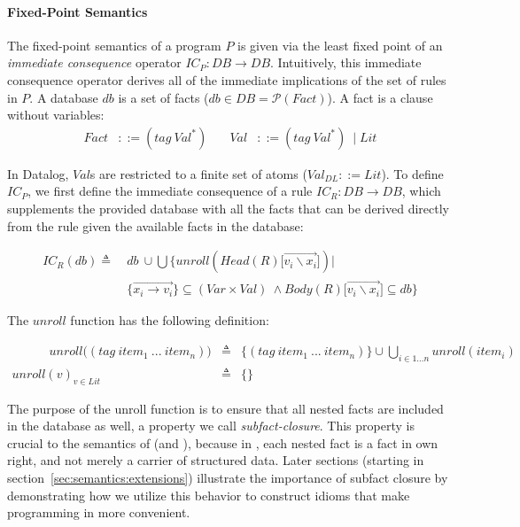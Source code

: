 \paragraph*{Fixed-Point Semantics}

The fixed-point semantics of a \core{} program $P$ is given via the
least fixed point of an \emph{immediate consequence} operator
$\textit{IC}_P : \textit{DB} \rightarrow \textit{DB}$. Intuitively,
this immediate consequence operator derives all of the immediate
implications of the set of rules in $P$. A
database $\textit{db}$ is a set of facts ($\textit{db} \in \textit{DB}
= \mathcal{P}(\textit{Fact})$). A fact is a clause without variables:
\begin{align*}
\textit{Fact} &::= (\textit{tag}\ \textit{Val}^*) & \quad
\textit{Val}  &::= (\textit{tag}\ \textit{Val}^*)\ \mid \textit{Lit}
\end{align*}

In Datalog, $\textit{Val}$s are restricted to a finite set of atoms
($\textit{Val}_{\textit{DL}} ::= \textit{Lit}$). To define $IC_P$, we
first define the immediate consequence of a rule $IC_R : DB
\rightarrow DB$, which supplements the provided database with all the
facts that can be derived directly from the rule given the available
facts in the database:

\begin{align*}    
\textit{IC}_R(db) \triangleq\ & db\ \cup \bigcup \bigl\{ \textit{unroll}(\textit{Head}(R)\big[\overrightarrow{v_i\backslash x_i}\big]) | \\
& \{\overrightarrow{x_i \rightarrow v_i}\} \subseteq (\textit{Var} \times \textit{Val})\ \wedge
\textit{Body}(R)\big[\overrightarrow{v_i \backslash x_i}\big] \subseteq db \bigr\}
\end{align*}

The $unroll$ function has the following definition:

\begin{centering}
  {\centering$\begin{array}{rcl}
\quad\quad\quad \textit{unroll}\bigl((\textit{tag}\ \textit{item}_1\ ...\ \textit{item}_n)\bigr) &\triangleq&
\{(\textit{tag}\ \textit{item}_1\ ...\ \textit{item}_n)\} \cup \bigcup_{i \in {1 ... n}} \textit{unroll}(\textit{item}_i)   \\
\textit{unroll}(v)_{v \in \textit{Lit}} &\triangleq& \{\}
    \end{array}$}
\end{centering}

The purpose of the unroll function is to ensure that all nested facts are included in the database as well, a property we call \emph{subfact-closure}. This property is crucial to the semantics of \core{} (and \slog{}), because in \core{}, each nested fact is a fact in own right, and not merely a carrier of structured data. Later sections (starting in section~\ref{sec:semantics:extensions}) illustrate the importance of subfact closure by demonstrating how  we utilize this behavior to construct idioms that make programming in \slog{} more convenient.

